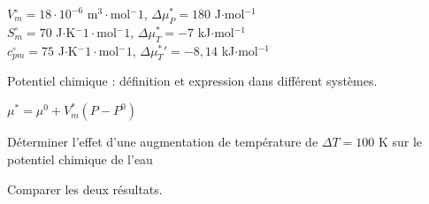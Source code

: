 \begin{solution}
    $V^\circ_m = 18 \cdot 10^{-6}$ m$^3\cdot$mol$^-1$, $\Delta\mu^\ast_P = 180$ J$\cdot$mol$^{-1}$ \\
    $S^\circ_m = 70$ J$\cdot$K$^-1\cdot$mol$^-1$, $\Delta\mu^\ast_T = -7$ kJ$\cdot$mol$^{-1}$ \\
    $c^\circ_{pm} = 75$ J$\cdot$K$^-1\cdot$mol$^-1$, ${\Delta\mu^\ast_T}' = -8,14$ kJ$\cdot$mol$^{-1}$
    

\begin{questions}
    \questioncours Potentiel chimique : définition et expression dans différent systèmes.
    
    \question $\mu^* = \mu^0 + V_m^* (P-P^0)$
    
    \question Déterminer l'effet d'une augmentation de température de $\Delta T = 100$ K sur le potentiel chimique de l'eau
    Comparer les deux résultats.
    
\end{questions}


\end{solution}